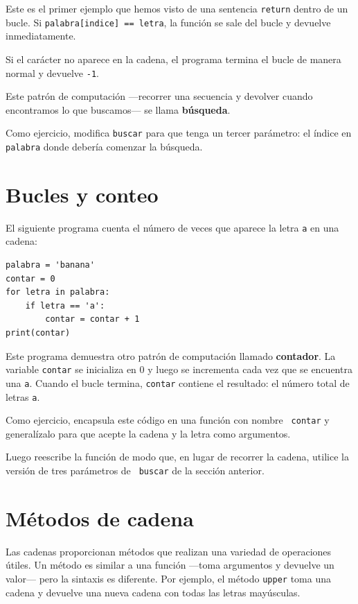 \documentclass[10pt]{book}
\begin{document}
Este es el primer ejemplo que hemos visto de una sentencia {\tt return}
dentro de un bucle.  Si {\tt palabra[indice] == letra}, la función se sale
del bucle y devuelve inmediatamente.

Si el carácter no aparece en la cadena, el programa
termina el bucle de manera normal y devuelve {\tt -1}.

Este patrón de computación ---recorrer una secuencia y devolver
cuando encontramos lo que buscamos--- se llama {\bf búsqueda}.

Como ejercicio, modifica {\tt buscar} para que tenga un
tercer parámetro: el índice en {\tt palabra} donde debería comenzar la
búsqueda.


\section{Bucles y conteo}
\label{counter}

El siguiente programa cuenta el número de veces que aparece la letra {\tt a}
en una cadena:

\begin{verbatim}
palabra = 'banana'
contar = 0
for letra in palabra:
    if letra == 'a':
        contar = contar + 1
print(contar)
\end{verbatim}
%
Este programa demuestra otro patrón de computación llamado {\bf
contador}.  La variable {\tt contar} se inicializa en 0 y luego
se incrementa cada vez que se encuentra una {\tt a}.
Cuando el bucle termina, {\tt contar}
contiene el resultado: el número total de letras {\tt a}.

Como ejercicio, encapsula este código en una función con nombre {\tt
contar} y generalízalo para que acepte la cadena y la
letra como argumentos.

Luego reescribe la función de modo que, en lugar de
recorrer la cadena, utilice la versión de tres parámetros de {\tt
buscar} de la sección anterior.


\section{Métodos de cadena}
\label{optional}

Las cadenas proporcionan métodos que realizan una variedad de operaciones útiles.
Un método es similar a una función ---toma argumentos y
devuelve un valor--- pero la sintaxis es diferente.  Por ejemplo, el
método {\tt upper} toma una cadena y devuelve una nueva cadena con
todas las letras mayúsculas.
\end{document}
